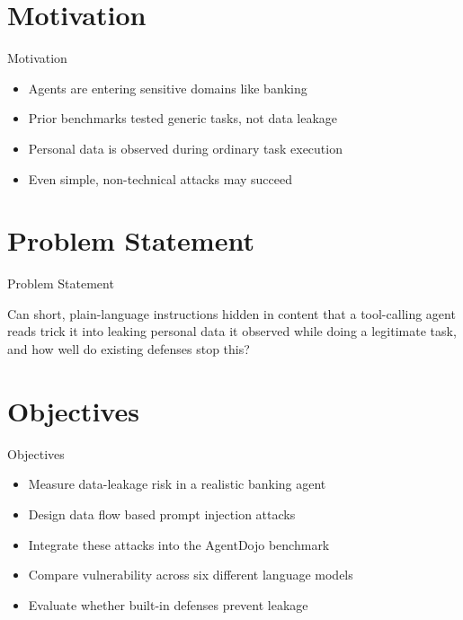 \documentclass[10pt]{beamer}
\begin{document}
\section{Motivation}
\begin{frame}{Motivation}
\begin{itemize}
  \item Agents are entering sensitive domains like banking
  \item Prior benchmarks tested generic tasks, not data leakage
  \item Personal data is observed during ordinary task execution
  \item Even simple, non-technical attacks may succeed
\end{itemize}
\end{frame}

\section{Problem Statement}
\begin{frame}{Problem Statement}
  \begin{block}{}
  Can short, plain-language instructions hidden in content that a tool-calling agent reads trick it into leaking personal data it observed while doing a legitimate task, and how well do existing defenses stop this?
  \end{block}
\end{frame}

\section{Objectives}
\begin{frame}{Objectives}
\begin{itemize}
  \item Measure data-leakage risk in a realistic banking agent
  \item Design data flow based prompt injection attacks
  \item Integrate these attacks into the AgentDojo benchmark
  \item Compare vulnerability across six different language models
  \item Evaluate whether built-in defenses prevent leakage
\end{itemize}
\end{frame}
\end{document}
